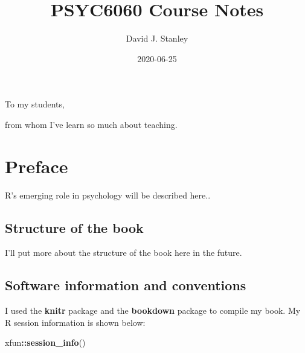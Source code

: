 \documentclass[
]{krantz}
\title{PSYC6060 Course Notes}
\author{David J. Stanley}
\date{2020-06-25}
\makeatletter
\newenvironment{Shaded}{\begin{snugshade}}{\end{snugshade}}
\newcommand{\KeywordTok}[1]{\textcolor[rgb]{0.27,0.27,0.27}{\textbf{#1}}}
\newcommand{\NormalTok}[1]{#1}
\newcommand{\OperatorTok}[1]{\textcolor[rgb]{0.43,0.43,0.43}{\textbf{#1}}}
\newenvironment{kframe}{%
\medskip{}
\setlength{\fboxsep}{.8em}
 \def\at@end@of@kframe{}%
 \ifinner\ifhmode%
  \def\at@end@of@kframe{\end{minipage}}%
  \begin{minipage}{\columnwidth}%
 \fi\fi%
 \def\FrameCommand##1{\hskip\@totalleftmargin \hskip-\fboxsep
 \colorbox{shadecolor}{##1}\hskip-\fboxsep
     \hskip-\linewidth \hskip-\@totalleftmargin \hskip\columnwidth}%
 \MakeFramed {\advance\hsize-\width
   \@totalleftmargin\z@ \linewidth\hsize
   \@setminipage}}%
 {\par\unskip\endMakeFramed%
 \at@end@of@kframe}
\renewenvironment{Shaded}{\begin{kframe}}{\end{kframe}}
\makeatother
\begin{document}
\maketitle


\thispagestyle{empty}

\begin{center}
To my students,

from whom I've learn so much about teaching.
\end{center}

\setlength{\abovedisplayskip}{-5pt}
\setlength{\abovedisplayshortskip}{-5pt}

{
\hypersetup{linkcolor=}
\setcounter{tocdepth}{2}
\tableofcontents
}
\listoftables
\listoffigures
\hypertarget{preface}{%
\chapter*{Preface}\label{preface}}


R's emerging role in psychology will be described here..

\hypertarget{structure-of-the-book}{%
\section*{Structure of the book}\label{structure-of-the-book}}


I'll put more about the structure of the book here in the future.

\hypertarget{software-information-and-conventions}{%
\section*{Software information and conventions}\label{software-information-and-conventions}}


I used the \textbf{knitr} package \citep{xie2015} and the \textbf{bookdown} package \citep{R-bookdown} to compile my book. My R session information is shown below:

\begin{Shaded}
\begin{Highlighting}[]
\NormalTok{xfun}\OperatorTok{::}\KeywordTok{session_info}\NormalTok{()}
\end{Highlighting}
\end{Shaded}
\end{document}
